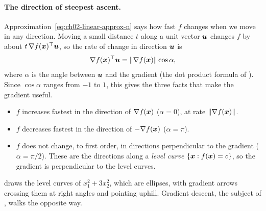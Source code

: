 \paragraph{The direction of steepest ascent.}
Approximation~\eqref{eq:ch02-linear-approx-n} says how fast $f$ changes
when we move in any direction. Moving a small distance $t$ along a unit
vector $\bm{u}$ changes $f$ by about $t\, \nabla f(\bm{x})^\top
\bm{u}$, so the rate of change in direction $\bm{u}$ is
\[
  \nabla f(\bm{x})^\top \bm{u}
  = \|\nabla f(\bm{x})\| \cos \alpha ,
\]
where $\alpha$ is the angle between $\bm{u}$ and the gradient (the dot
product formula of ). Since $\cos \alpha$ ranges from $-1$
to $1$, this gives the three facts that make the gradient useful.
\begin{itemize}
  \item $f$ increases fastest in the direction of $\nabla f(\bm{x})$
    ($\alpha = 0$), at rate $\|\nabla f(\bm{x})\|$.
  \item $f$ decreases fastest in the direction of $-\nabla f(\bm{x})$
    ($\alpha = \pi$).
  \item $f$ does not change, to first order, in directions perpendicular
    to the gradient ($\alpha = \pi / 2$). These are the directions along a
    \emph{level curve} $\{\bm{x} : f(\bm{x}) = c\}$, so the gradient is
    perpendicular to the level curves.
\end{itemize}
 draws the level curves of
$x_1^2 + 3x_2^2$, which are ellipses, with gradient arrows crossing them at
right angles and pointing uphill. Gradient descent, the subject of
, walks the opposite way.

